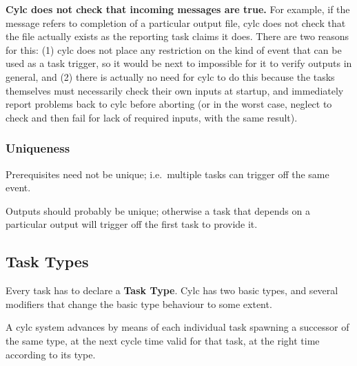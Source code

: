 \documentclass[11pt,a4paper]{article}
\begin{document}
{\bf Cylc does not check that incoming messages are true.}  For example,
if the message refers to completion of a particular output file, cylc
does not check that the file actually exists as the reporting task
claims it does. There are two reasons for this: (1) cylc does not place
any restriction on the kind of event that can be used as a task trigger,
so it would be next to impossible for it to verify outputs in general,
and (2) there is actually no need for cylc to do this because the tasks
themselves must necessarily check their own inputs at startup, and
immediately report problems back to cylc before aborting (or in the
worst case, neglect to check and then fail for lack of required inputs,
with the same result).


\subsubsection{Uniqueness}

Prerequisites need not be unique; i.e.\ multiple tasks can trigger off
the same event.

Outputs should probably be unique; otherwise a task that depends on a
particular output will trigger off the first task to provide it.


\subsection{Task Types} 

Every task has to declare a {\bf Task Type}. Cylc has two basic types,
and several modifiers that change the basic type behaviour to some
extent.  

A cylc system advances by means of each individual task spawning a 
successor of the same type, at the next cycle time valid for that task,
at the right time according to its type.
\end{document}

